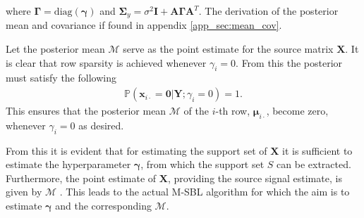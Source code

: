 where $\boldsymbol{\Gamma} = \text{diag}(\boldsymbol{\gamma})$ and $\boldsymbol{\Sigma}_y = \sigma^2 \mathbf{I} + \mathbf{A} \boldsymbol{\Gamma} \mathbf{A}^T$. The derivation of the posterior mean and covariance if found in appendix \ref{app_sec:mean_cov}.   

Let the posterior mean $\mathcal{M}$ serve as the point estimate for the source matrix $\mathbf{X}$.
It is clear that row sparsity is achieved whenever $\gamma_i = 0$. 
From this the posterior must satisfy the following 
\begin{align*}
\mathbb{P}(\mathbf{x}_{i \cdot} = \mathbf{0} \vert \mathbf{Y} ; \gamma_i = 0) = 1.
\end{align*}
This ensures that the posterior mean $\mathcal{M}$ of the $i$-th row, $\boldsymbol{\mu}_{i \cdot}$, become zero, whenever $\gamma_i = 0$ as desired.

From this it is evident that for estimating the support set of $\mathbf{X}$ it is sufficient to estimate the hyperparameter $\boldsymbol{\gamma}$, from which the support set $S$ can be extracted. Furthermore, the point estimate of $\mathbf{X}$, providing the source signal estimate, is given by $\mathcal{M}$ \cite[p. 147]{phd_wipf}. 
This leads to the actual M-SBL algorithm for which the aim is to estimate $\boldsymbol{\gamma}$ and the corresponding $\mathcal{M}$.


